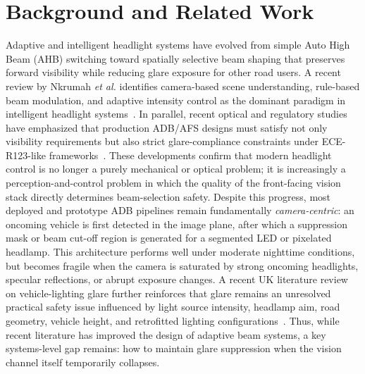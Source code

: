 \documentclass[pdflatex,sn-mathphys-num]{sn-jnl}%
\theoremstyle{thmstyleone}%
\theoremstyle{thmstyletwo}%
\theoremstyle{thmstylethree}%
\begin{document}
\section{Background and Related Work}
\label{sec:related}


Adaptive and intelligent headlight systems have evolved from simple Auto High Beam (AHB) switching toward spatially selective beam shaping that preserves forward visibility while reducing glare exposure for other road users. A recent review by Nkrumah \emph{et al.} identifies camera-based scene understanding, rule-based beam modulation, and adaptive intensity
control as the dominant paradigm in intelligent headlight systems~\cite{nkrumah2024review}. In parallel, recent optical and regulatory studies have emphasized that production ADB/AFS designs must satisfy not only visibility requirements but also strict glare-compliance constraints under ECE-R123-like frameworks~\cite{shin2026optimization}. These developments confirm that modern headlight control is no longer a purely mechanical or optical problem; it is increasingly a perception-and-control problem in which the quality of the front-facing vision stack directly determines beam-selection safety.
Despite this progress, most deployed and prototype ADB pipelines remain
fundamentally \emph{camera-centric}: an oncoming vehicle is first detected
in the image plane, after which a suppression mask or beam cut-off region is generated for a segmented LED or pixelated headlamp. This architecture performs well under moderate nighttime conditions, but becomes fragile when the camera is saturated by strong oncoming headlights, specular reflections, or abrupt exposure changes. A recent UK literature review on vehicle-lighting glare further reinforces that glare remains an unresolved practical safety issue influenced by light source intensity, headlamp aim, road geometry, vehicle height, and retrofitted lighting
configurations~\cite{beard2025glarelitreview}. Thus, while recent literature has improved the design of adaptive beam systems, a key systems-level gap remains: how to maintain glare suppression when the vision channel itself
temporarily collapses.

\end{document}
